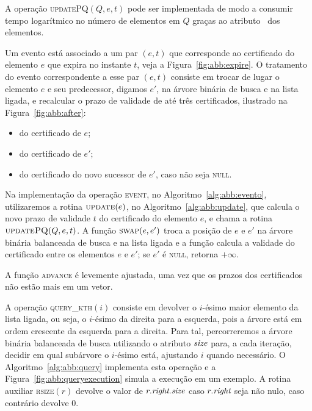 A operação \textsc{updatePQ}$(Q,e,t)$ pode ser implementada de modo
a consumir tempo logarítmico no número de elementos em $Q$ graças ao
atributo \pqpos~dos elementos.



Um evento está associado a um par $(e, t)$ que corresponde ao
certificado do elemento $e$ que expira no instante $t$, veja a Figura~\ref{fig:abb:expire}.
O tratamento do evento correspondente a esse par $(e, t)$ consiste em trocar de
lugar o elemento $e$ e seu predecessor, digamos $e'$, na árvore
binária de busca e na lista ligada, e recalcular o prazo de validade
de até três certificados, ilustrado na Figura~\ref{fig:abb:after}:

\begin{itemize}
    \item do certificado de $e$;
    \item do certificado de $e'$;
    \item do certificado do novo sucessor de $e'$, caso não seja \textsc{null}.
\end{itemize}



Na implementação da operação \textsc{event}, no Algoritmo~\ref{alg:abb:evento}, utilizaremos a rotina
$\textsc{update}(e)$, no Algoritmo~\ref{alg:abb:update}, que calcula o novo prazo de validade $t$
do certificado do elemento $e$, e chama a rotina~$\textsc{updatePQ}(Q, e, t)$.
A função $\textsc{swap}(e, e')$ troca a posição de $e$ e $e'$ na árvore binária balanceada
de busca e na lista ligada e a função  calcula
a validade do certificado entre os elementos $e$ e $e'$; se $e'$ é
\textsc{null}, retorna $+\infty$.

A função \textsc{advance} é levemente ajustada, uma vez que os prazos dos certificados não estão
mais em um vetor.







A operação \textsc{query\_kth}$(i)$ consiste em devolver o $i$-ésimo
maior elemento da lista ligada, ou seja, o $i$-ésimo da direita para
a esquerda, pois a árvore está em ordem crescente da esquerda para a
direita.
Para tal, percorreremos a árvore binária balanceada de busca utilizando o atributo $\textit{size}$
para, a cada iteração, decidir em qual subárvore o $i$-ésimo está, ajustando $i$ quando
necessário.
O Algoritmo~\ref{alg:abb:query} implementa esta operação e a Figura~\ref{fig:abb:queryexecution}
simula a execução em um exemplo.
A rotina auxiliar \textsc{rsize}$(r)$ devolve o valor de $r.\textit{right}.\textit{size}$ caso $r.\textit{right}$ seja
não nulo, caso contrário devolve $0$.

